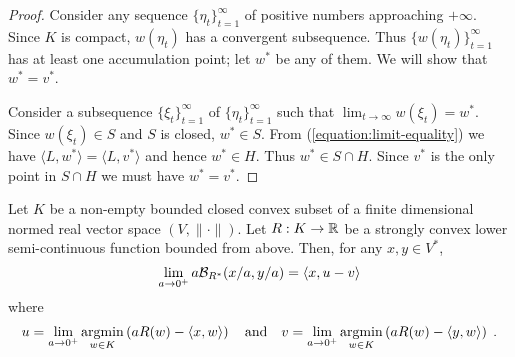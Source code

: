 \begin{proof}
Consider any sequence $\{\eta_t\}_{t=1}^\infty$ of positive numbers approaching
$+\infty$.  Since $K$ is compact, $w(\eta_t)$ has a convergent subsequence.
Thus $\{w(\eta_t)\}_{t=1}^\infty$ has at least one accumulation point; let
$w^*$ be any of them. We will show that $w^* = v^*$.

Consider a subsequence $\{\xi_t\}_{t=1}^\infty$ of
$\{\eta_t\}_{t=1}^\infty$ such that $\lim_{t \to \infty} w(\xi_t) = w^*$.
Since $w(\xi_t) \in S$ and $S$ is closed, $w^* \in S$.
From (\ref{equation:limit-equality}) we have $\langle L, w^*
\rangle = \langle L, v^* \rangle$ and hence $w^* \in H$. Thus $w^* \in S \cap H$.
Since $v^*$ is the only point in $S \cap H$ we must have $w^* = v^*$.
\end{proof}

\begin{lemma}
\label{lemma:limit-bregman-divergence}
Let $K$ be a non-empty bounded closed convex subset of a finite dimensional
normed real vector space $(V, \|\cdot\|)$.  Let $R:K \to \mathbb{R}$ be a strongly
convex lower semi-continuous function bounded from above. Then, for any $x,y
\in V^*$,
$$
\lim_{a \to 0^+} a \mathcal{B}_{R^*}(x/a, y/a) = \langle x, u - v \rangle \\
$$
where
\begin{align*}
u = \lim_{a \to 0^+} \operatorname*{argmin}_{w \in K} \left( a R(w) - \langle x, w \rangle \right)
\quad \text{and} \quad
v = \lim_{a \to 0^+} \operatorname*{argmin}_{w \in K} \left( a R(w) - \langle y, w \rangle \right) \; .
\end{align*}
\end{lemma}

